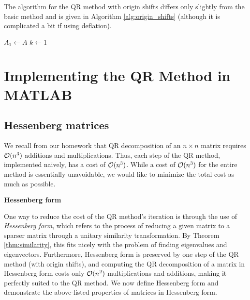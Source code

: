 \documentclass{article}
\begin{document}
The algorithm for the QR method with origin shifts differs only slightly from the basic method and is given in Algorithm \ref{alg:origin_shifts} (although it is complicated a bit if using deflation).


\begin{algorithm}[htb!]
	\caption{The QR Method with Origin Shifts}
	\label{alg:origin_shifts}
	
	$A_1 \gets A$\;
	$k \gets 1$\;
\end{algorithm}


\section{Implementing the QR Method in MATLAB}

\subsection{Hessenberg matrices}

We recall from our homework that QR decomposition of an $n\times n$ matrix requires $\mathcal{O}(n^3)$ additions and multiplications. Thus, each step of the QR method, implemented naively, has a cost of $\mathcal{O}(n^3)$. While a cost of $\mathcal{O}(n^3)$ for the entire method is essentially unavoidable, we would like to minimize the total cost as much as possible. 

\textbf{Hessenberg form}

One way to reduce the cost of the QR method's iteration is through the use of \textit{Hessenberg form}, which refers to the process of reducing a given matrix to a sparser matrix through a unitary similarity transformation. By Theorem \ref{thm:similarity}, this fits nicely with the problem of finding eigenvalues and eigenvectors. Furthermore, Hessenberg form is preserved by one step of the QR method (with origin shifts), and computing the QR decomposition of a matrix in Hessenberg form costs only $\mathcal{O}(n^2)$ multiplications and additions, making it perfectly suited to the QR method. We now define Hessenberg form and demonstrate the above-listed properties of matrices in Hessenberg form. 
\end{document}

